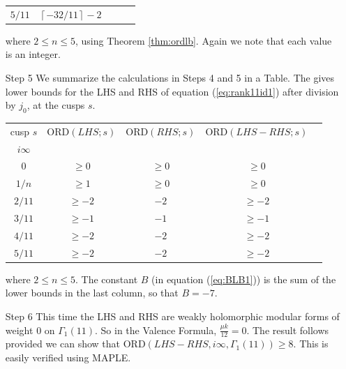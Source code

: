 \documentclass[12pt]{amsart}
\theoremstyle{definition}
\theoremstyle{remark}
\numberwithin{equation}{section}
\newcommand\CL[1]{\left\lceil#1\right\rceil}
\newcommand\ORD{\mbox{ORD}}
\newcommand\thm[1]{\ref{thm:#1}}
\newcommand\eqn[1]{(\ref{eq:#1})}
\begin{document}
\begin{enumerate}
\begin{center}
\begin{tabular}{c c c c c}
$5/11$       &   $\CL{-32/11}-2$ 
\end{tabular} 
\end{center} 
where $2\le n\le 5$, using Theorem \thm{ordlb}. 
Again we note that each value is an integer.
\item[Step 5] 
We summarize the calculations in Steps 4 and 5 in a Table.
The gives lower bounds for the LHS and RHS of equation \eqn{rank11id1}
after division by $j_0$,
at the cusps $s$.
\begin{center}
\begin{tabular}{c c c c c}
cusp $s$ & $\ORD(LHS;s)$ & $\ORD(RHS;s)$ 
& $\ORD(LHS-RHS;s)$ \\
$i\infty$   &            &          &            \\
$0$        &  $\ge0$    &  $\ge0$  &   $\ge 0$  \\
$1/n$      &  $\ge1$ &   $\ge0$  &   $\ge 0$  \\
$2/11$      &  $\ge-2$   &  $-2$    &   $\ge -2$ \\ 
$3/11$      &  $\ge-1$   &  $-1$    &   $\ge -1$ \\ 
$4/11$      &  $\ge-2$   &  $-2$    &   $\ge -2$  \\ 
$5/11$      &  $\ge-2$   &  $-2$    &   $\ge -2$ 
\end{tabular} 
\end{center} 
where $2\le n\le 5$. The constant $B$ (in equation \eqn{BLB1}) is
the sum of the lower bounds in the last column, so that $B=-7$.
\item[Step 6] This time the LHS and RHS are weakly holomorphic modular 
forms of weight $0$ on $\Gamma_1(11)$. 
So in the Valence Formula, $\frac{\mu k}{12} = 0$. 
The result follows provided we can show that 
$\ORD(LHS-RHS,i\infty,\Gamma_1(11))\geq 8$. 
This is easily verified using MAPLE.
\end{enumerate}
\end{document}
